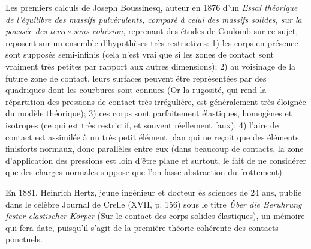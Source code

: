 \medskip
\begin{histoire}%
Les premiers calculs de Joseph Boussinesq,
auteur en 1876 d'un \emph{Essai théorique de l'équilibre des massifs pulvérulents, comparé à celui des
massifs solides, sur la poussée des terres sans cohésion}, reprenant des études de
Coulomb sur ce sujet, reposent sur
un ensemble d'hypothèses très restrictives:
1) les corps en présence sont supposés semi-infinis (cela n'est vrai que si les zones de contact sont
vraiment très petites par rapport aux autres dimensions);
2) au voisinage de la future zone de contact, leurs surfaces peuvent être représentées par des
quadriques dont les courbures sont connues (Or la rugosité, qui rend la répartition des pressions
de contact très irrégulière, est généralement très éloignée du modèle théorique);
3) ces corps sont parfaitement élastiques, homogènes et isotropes (ce qui est très restrictif,
et souvent réellement faux);
4) l'aire de contact est assimilée à un très petit élément plan qui ne reçoit que des éléments finisforts
normaux, donc parallèles entre eux (dans beaucoup de contacts, la zone d'application des pressions
est loin d'être plane et surtout, le fait de ne considérer que des charges normales suppose que l'on
fasse abstraction du frottement).

\medskip
En 1881, Heinrich Hertz, jeune ingénieur et
docteur ès sciences de 24 ans, publie dans le célèbre Journal de Crelle (XVII, p. 156) sous le titre
\emph{Über die Beruhrung fester elastischer Körper} (Sur le contact des corps solides élastiques),
un mémoire qui fera date, puisqu'il s'agit de la première théorie cohérente des contacts ponctuels.


\end{histoire}
